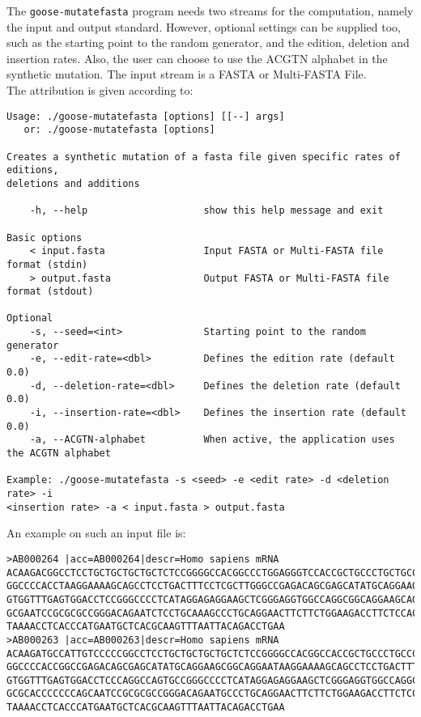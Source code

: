 The \texttt{goose-mutatefasta} program needs two streams for the computation, namely the input and output standard. However, optional settings can be supplied too, such as the starting point to the random generator, and the edition, deletion and insertion rates. Also, the user can choose to use the ACGTN alphabet in the synthetic mutation. The input stream is a FASTA or Multi-FASTA File.\\
The attribution is given according to:
\begin{lstlisting}
Usage: ./goose-mutatefasta [options] [[--] args]
   or: ./goose-mutatefasta [options]

Creates a synthetic mutation of a fasta file given specific rates of editions, 
deletions and additions

    -h, --help                    show this help message and exit

Basic options
    < input.fasta                 Input FASTA or Multi-FASTA file format (stdin)
    > output.fasta                Output FASTA or Multi-FASTA file format (stdout)

Optional
    -s, --seed=<int>              Starting point to the random generator
    -e, --edit-rate=<dbl>         Defines the edition rate (default 0.0)
    -d, --deletion-rate=<dbl>     Defines the deletion rate (default 0.0)
    -i, --insertion-rate=<dbl>    Defines the insertion rate (default 0.0)
    -a, --ACGTN-alphabet          When active, the application uses the ACGTN alphabet

Example: ./goose-mutatefasta -s <seed> -e <edit rate> -d <deletion rate> -i 
<insertion rate> -a < input.fasta > output.fasta
\end{lstlisting}
An example on such an input file is:
\begin{lstlisting}
>AB000264 |acc=AB000264|descr=Homo sapiens mRNA 
ACAAGACGGCCTCCTGCTGCTGCTGCTCTCCGGGGCCACGGCCCTGGAGGGTCCACCGCTGCCCTGCTGCCATTGTCCCC
GGCCCCACCTAAGGAAAAGCAGCCTCCTGACTTTCCTCGCTTGGGCCGAGACAGCGAGCATATGCAGGAAGCGGCAGGAA
GTGGTTTGAGTGGACCTCCGGGCCCCTCATAGGAGAGGAAGCTCGGGAGGTGGCCAGGCGGCAGGAAGCAGGCCAGTGCC
GCGAATCCGCGCGCCGGGACAGAATCTCCTGCAAAGCCCTGCAGGAACTTCTTCTGGAAGACCTTCTCCACCCCCCCAGC
TAAAACCTCACCCATGAATGCTCACGCAAGTTTAATTACAGACCTGAA
>AB000263 |acc=AB000263|descr=Homo sapiens mRNA 
ACAAGATGCCATTGTCCCCCGGCCTCCTGCTGCTGCTGCTCTCCGGGGCCACGGCCACCGCTGCCCTGCCCCTGGAGGGT
GGCCCCACCGGCCGAGACAGCGAGCATATGCAGGAAGCGGCAGGAATAAGGAAAAGCAGCCTCCTGACTTTCCTCGCTTG
GTGGTTTGAGTGGACCTCCCAGGCCAGTGCCGGGCCCCTCATAGGAGAGGAAGCTCGGGAGGTGGCCAGGCGGCAGGAAG
GCGCACCCCCCCAGCAATCCGCGCGCCGGGACAGAATGCCCTGCAGGAACTTCTTCTGGAAGACCTTCTCCTCCTGCAAA
TAAAACCTCACCCATGAATGCTCACGCAAGTTTAATTACAGACCTGAA
\end{lstlisting}

